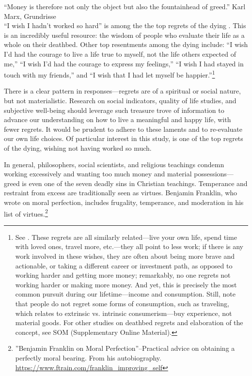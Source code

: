 \documentclass[10pt, letterpaper]{article}
\begin{document}
\begin{spacing}{1.8} %


\noindent``Money is therefore not only the object but also the fountainhead of greed.'' Karl Marx, Grundrisse\\



\noindent ``I wish I hadn't worked so hard'' is among the the top regrets of the dying \citep{ware12}.
 This is an incredibly useful resource:  the wisdom of people who evaluate their life as a whole on their deathbed. Other top resentments among the dying include: ``I wish I'd had the courage to live a life true to myself, not the life others
expected of me,'' ``I wish I'd had the courage to express my feelings,'' ``I wish I had stayed in touch with my friends,'' and ``I wish that I had let myself be happier.''\footnote{See \citet{ware12}. These regrets are all similarly related---live your own life, spend time with loved ones, travel more, etc.---they all
  point to less work; if there is any work involved in these wishes, they are often about being
  more brave and actionable, or taking a different career or investment path, as opposed to
  working harder and getting more money; remarkably,  no one regrets not working harder or making more money. And yet, this is precisely the most common pursuit during our lifetime---income and consumption. Still, note that people do not regret some forms of consumption, such as traveling, which relates to extrinsic vs. intrinsic consumerism---buy experience, not material goods. For other studies on deathbed regrets and elaboration of the concept, see SOM (Supplementary Online Material).}

There is a clear pattern
in responses---regrets are of a spiritual or social nature, but not materialistic. Research on social indicators, quality of life studies, and subjective well-being should leverage such treasure
trove of information
to advance our understanding on how to live a meaningful and happy life, with fewer regrets. 
It  would be prudent to adhere to these laments and to re-evaluate our own life choices. Of particular interest in this study, is one of the top regrets of the dying, wishing not having worked so much.  

In general, philosophers, social scientists, 
 and religious teachings condemn working excessively and wanting too much money and material possessions---greed is even one of the seven deadly sins in Christian teachings. 
Temperance and restraint from excess are traditionally seen as virtues. Benjamin Franklin, who wrote on moral perfection, includes frugality, temperance, and moderation in his list of virtues.\footnote{''Benjamin Franklin on Moral Perfection''--Practical advice on obtaining a perfectly moral bearing. From his autobiography. \url{https://www.ftrain.com/franklin_improving_self}}


\end{spacing}
\end{document}
